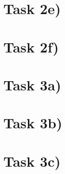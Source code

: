 \documentclass[a4paper,oneside,bibliography=totoc]{scrartcl}
\begin{document}
\section*{Task 2e)}
\begin{answer}[19.5cm]
\end{answer}


\section*{Task 2f)}
\begin{answer}[15.5cm]
\end{answer}

\section*{Task 3a)}
\begin{answer}[15.5cm]
\end{answer}

\section*{Task 3b)}
\begin{answer}[15.5cm]
\end{answer}


\section*{Task 3c)}
\begin{answer}[19.5cm]
\end{answer}

\newpage

\end{document}
